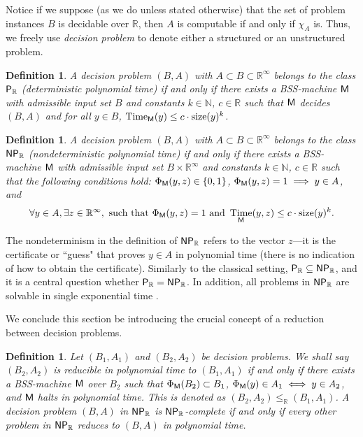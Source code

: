 \documentclass{amsart}
\theoremstyle{theorem}
\newtheorem{definition}[theorem]{Definition}
\theoremstyle{remark}
\DeclareMathOperator{\Size}{size}
\DeclareMathOperator{\Time}{Time}
\newcommand{\NN}{\mathbb{N}}
\newcommand{\RR}{\mathbb{R}}
\newcommand{\ccP}{\textsf{\upshape P}}
\newcommand{\ccNP}{\textsf{\upshape NP}}
\newcommand{\ccM}{\textsf{\upshape M}}
\begin{document}
Notice if we suppose (as we do unless stated otherwise) that the set of problem instances $B$ is decidable over $\RR$, then $A$ is computable if and only if $\chi_{A}$ is. Thus, we freely use \emph{decision problem} to denote either a structured or an unstructured problem.

\begin{definition}
A decision problem $(B, A)$ with $A \subset B \subset \RR^\infty$ belongs to the class $\ccP_\RR$ (\emph{deterministic polynomial time}) if and only if there exists a BSS-machine $\ccM$ with admissible input set $B$ and constants $k \in \NN$, $c \in \RR$ such that $\ccM$ decides $(B, A)$ and for all $y \in B$, $\Time_\ccM(y) \leq c\cdot \Size(y)^k$.
\end{definition}

\begin{definition}
A decision problem $(B, A)$ with $A \subset B \subset \RR^\infty$ belongs to the class $\ccNP_\RR$ (\emph{nondeterministic polynomial time}) if and only if there exists a BSS-machine $\ccM$ with admissible input set $B \times \RR^\infty$ and constants
$k \in \NN$,
$c \in \RR$
such that the following conditions hold:
$\Phi_\ccM(y, z) \in \{0,1\}$, $\Phi_\ccM(y, z) =1 \implies y \in A$, and
\[
\forall y \in A, \exists z \in \RR^\infty, \text{ such that } \Phi_\ccM(y, z) = 1 \text{ and } \Time_\ccM(y, z) \leq c \cdot \Size(y)^k.
\]
\end{definition}

The nondeterminism in the definition of $\ccNP_\RR$ refers to the vector $z$---it is the certificate or ``guess" that proves $y \in A$ in polynomial time (there is no indication of how to obtain the certificate).
Similarly to the classical setting, $\ccP_\RR \subseteq \ccNP_\RR$, and it is a central question whether $\ccP_\RR = \ccNP_\RR$. In addition, all problems in $\ccNP_\RR$ are solvable in single exponential time \cite{blum1989theory}.

We conclude this section be introducing the crucial concept of a reduction between decision problems.

\begin{definition}
Let $(B_1, A_1)$ and $(B_2, A_2)$ be decision problems.
We shall say $(B_2, A_2)$ is \emph{reducible in polynomial time} to $(B_1, A_1)$ if and only if there exists a BSS-machine $\ccM$ over $B_2$ such that $\Phi_\ccM(B_2) \subset B_1$, $\Phi_\ccM(y) \in A_1 \iff y \in A_2$, and $\ccM$ halts in polynomial time. This is denoted as $(B_2, A_2) \leq_\RR (B_1,A_1)$. A decision problem $(B, A)$ in $\ccNP_\RR$ is \emph{$\ccNP_\RR$-complete} if and only if every other problem in $\ccNP_\RR$ reduces to $(B, A)$ in polynomial time.
\end{definition}
\end{document}
